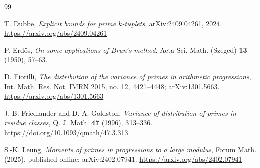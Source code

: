 \documentclass[11pt]{article}
\theoremstyle{definition}
\theoremstyle{remark}
\newcommand{\1}{\mathbf 1}
\begin{document}
\begin{thebibliography}{99}

T. Dubbe,
\emph{Explicit bounds for prime $k$-tuplets},
arXiv:2409.04261, 2024.
\url{https://arxiv.org/abs/2409.04261}

P. Erd\H{o}s,
\emph{On some applications of Brun's method},
Acta Sci. Math. (Szeged) \textbf{13} (1950), 57--63.

D. Fiorilli,
\emph{The distribution of the variance of primes in arithmetic progressions},
Int. Math. Res. Not. IMRN 2015, no. 12, 4421--4448;
arXiv:1301.5663.
\url{https://arxiv.org/abs/1301.5663}

J. B. Friedlander and D. A. Goldston,
\emph{Variance of distribution of primes in residue classes},
Q. J. Math. \textbf{47} (1996), 313--336.
\url{https://doi.org/10.1093/qmath/47.3.313}

S.-K. Leung,
\emph{Moments of primes in progressions to a large modulus},
Forum Math. (2025), published online;
arXiv:2402.07941.
\url{https://arxiv.org/abs/2402.07941}

\end{thebibliography}
\end{document}
